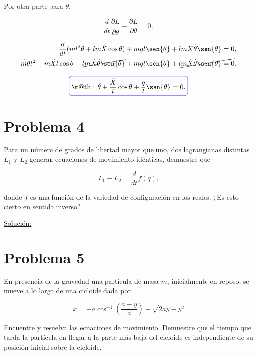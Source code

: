 \documentclass[a4paper,10pt]{article}
\makeatletter
\numberwithin{equation}{section}
\newcommand*{\boxcolor}{blue}
\renewcommand{\boxed}[1]{\textcolor{\boxcolor}{%
\tikz[baseline={([yshift=-1ex]current bounding box.center)}] \node [rectangle, minimum width=1ex,rounded corners,draw] {\normalcolor\m@th$\displaystyle#1$};}}
\makeatother
\begin{document}
Por otra parte para $\theta$,

\begin{equation}
  \frac{d}{dt}\frac{\partial L}{\partial \dot{\theta}} - \frac{\partial L}{\partial \theta} = 0,
\end{equation}

\begin{align}
\begin{split}
 \frac{d}{dt}(ml^2 \dot{\theta} + lm \dot{X} \cos{\theta}) + mgl\sen{\theta} +
 lm \dot{X} \dot{\theta} \sen{\theta} = 0, \\
 \ddot{m\theta}l^2  + m\ddot{X}l\cos{\theta} - \cancel{lm\dot{X}\dot{\theta}\sen{\theta}} + mgl\sen{\theta} +
 \cancel{lm \dot{X} \dot{\theta} \sen{\theta} = 0}. \\
 \end{split}
\end{align}

\begin{equation}
 \boxed{\therefore \ddot{\theta}  + \frac{\ddot{X}}{l}\cos{\theta} + \frac{g}{l}\sen{\theta} = 0.}
\end{equation}



\section{Problema 4}

Para un número de grados de libertad mayor que uno, dos lagrangianas distintas $L_1$
y $L_2$ generan ecuaciones de movimiento idénticas, demuestre que 

$$
L_1 - L_2 = \frac{d}{dt}f(q),
$$

donde $f$ es una función de la variedad de configuración en los reales. ¿Es esto cierto 
en sentido inverso?

\vspace{.3cm}

\underline{Solución:} \vspace{.3cm}

\section{Problema 5}

En presencia de la gravedad una partícula de masa $m$, inicialmente en reposo, se 
mueve a lo largo de una cicloide dada por 

$$
x = \pm a \cos^{-1}{\left(\frac{a-y}{a}\right)} + \sqrt{2ay-y^2}
$$

Encuentre y resuelva las ecuaciones de movimiento. Demuestre que el tiempo que tarda 
la partícula en llegar a la parte más baja del cicloide es independiente de su 
posición inicial sobre la cicloide.
\end{document}
